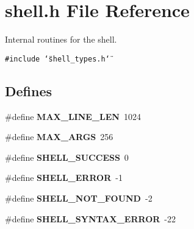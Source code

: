 \section{shell.h File Reference}
\label{shell_8h}
Internal routines for the shell. 

{\tt \#include \char`\"{}shell\_\-types.h\char`\"{}}\par
\subsection*{Defines}
\begin{CompactItemize}
\item 
\#define {\bf MAX\_\-LINE\_\-LEN}\ 1024
\item 
\#define {\bf MAX\_\-ARGS}\ 256
\item 
\#define {\bf SHELL\_\-SUCCESS}\ 0
\item 
\#define {\bf SHELL\_\-ERROR}\ -1
\item 
\#define {\bf SHELL\_\-NOT\_\-FOUND}\ -2
\item 
\#define {\bf SHELL\_\-SYNTAX\_\-ERROR}\ -22
\end{CompactItemize}
